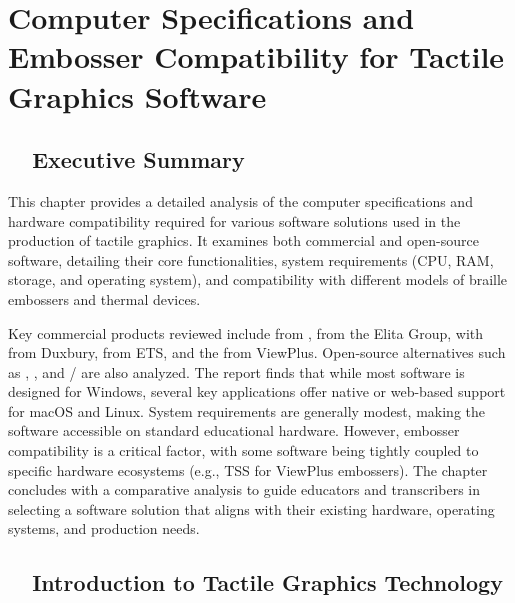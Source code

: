 \chapter{Computer Specifications and Embosser Compatibility for Tactile Graphics Software}\label{ch14:tactile-graphics-specs}
\raggedright

\section{~~Executive Summary}\label{ch14:sec:executive-summary}
This chapter provides a detailed analysis of the computer specifications and hardware compatibility required for various software solutions used in the production of tactile graphics. It examines both commercial and open-source software, detailing their core functionalities, system requirements (CPU, RAM, storage, and operating system), and compatibility with different models of braille embossers and thermal devices.

Key commercial products reviewed include  from \supercite{TactileViewIrie},  from the Elita Group\supercite{ElitaElPicsPrint},  with  from Duxbury\supercite{DuxburyDBT},  from ETS, and the  from ViewPlus\supercite{ViewplusTSS}. Open-source alternatives such as \supercite{SoftorageInkscape}, \supercite{TouchMapper}, and /\supercite{aph-brailleblaster} are also analyzed. The report finds that while most software is designed for Windows, several key applications offer native or web-based support for macOS and Linux. System requirements are generally modest, making the software accessible on standard educational hardware. However, embosser compatibility is a critical factor, with some software being tightly coupled to specific hardware ecosystems (e.g., TSS for ViewPlus embossers\supercite{ViewPlusProduct}). The chapter concludes with a comparative analysis to guide educators and transcribers in selecting a software solution that aligns with their existing hardware, operating systems, and production needs.

\section{~~Introduction to Tactile Graphics Technology}\label{ch14:sec:introduction}
